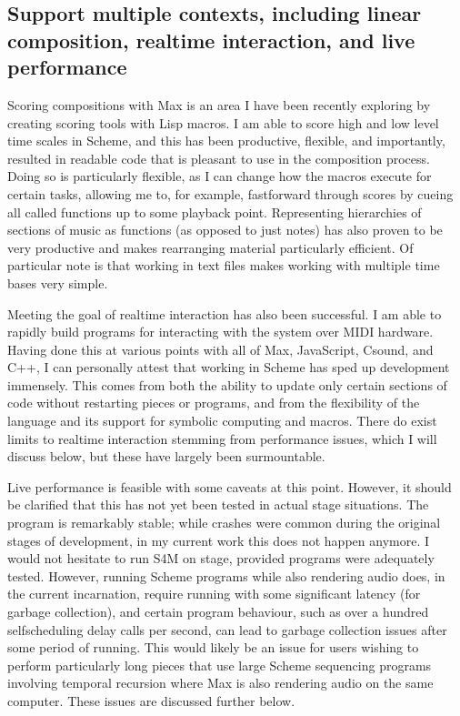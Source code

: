 \documentclass[letterpaper,10pt,english]{sphinxmanual}
\begin{document}
\subsection{Support multiple contexts, including linear composition, real\sphinxhyphen{}time interaction, and live performance}
\label{\detokenize{conclusion:support-multiple-contexts-including-linear-composition-real-time-interaction-and-live-performance}}
\sphinxAtStartPar
Scoring compositions with Max is an area I have been recently exploring by creating
scoring tools with Lisp macros.
I am able to score high and low level time scales in Scheme, and this has been productive,
flexible, and importantly, resulted in readable code that is pleasant to use in the composition process.
Doing so is particularly flexible, as I can change how the macros
execute for certain tasks, allowing me to, for example, fast\sphinxhyphen{}forward through scores by
cueing all called functions up to some playback point.
Representing hierarchies of sections of music as functions (as opposed to just notes)
has also proven to be very productive and makes rearranging material particularly efficient.
Of particular note is that working in text files makes working with multiple time bases very simple.

\sphinxAtStartPar
Meeting the goal of realtime interaction has also been successful.
I am able to rapidly build programs for interacting with the system over MIDI hardware.
Having done this at various points with all of Max, JavaScript, Csound, and C++, I
can personally attest that working in Scheme has sped up development immensely.
This comes from both the ability to update only certain sections of code without restarting
pieces or programs, and from the flexibility of the language and its support for symbolic
computing and macros. There do exist limits to realtime interaction stemming from performance
issues, which I will discuss below, but these have largely been surmountable.

\sphinxAtStartPar
Live performance is feasible with some caveats at this point. However, it should be
clarified that this has not yet been tested in actual stage situations.
The program is remarkably stable; while crashes were common
during the original stages of development, in my current work this
does not happen anymore. I would not hesitate to run S4M on stage,
provided programs were adequately tested.
However, running  Scheme programs while also rendering audio does, in the current incarnation,
require running with some significant latency (for garbage collection), and certain
program behaviour, such as over a hundred self\sphinxhyphen{}scheduling delay calls per second, can lead
to garbage collection issues after some period of running.
This would likely be an issue for users wishing to perform
particularly long pieces that use large Scheme sequencing programs involving temporal recursion
where Max is also rendering audio on the same computer.
These issues are discussed further below.
\end{document}
